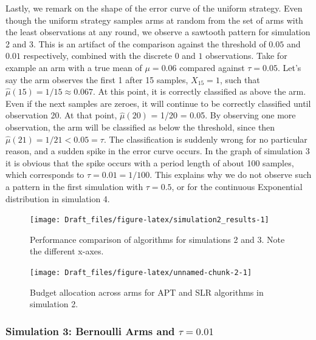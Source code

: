 \documentclass[11pt,]{article}
\begin{document}
Lastly, we remark on the shape of the error curve of the uniform
strategy. Even though the uniform strategy samples arms at random from
the set of arms with the least observations at any round, we observe a
sawtooth pattern for simulation 2 and 3. This is an artifact of the
comparison against the threshold of \(0.05\) and \(0.01\) respectively,
combined with the discrete \(0\) and \(1\) observations. Take for
example an arm with a true mean of \(\mu = 0.06\) compared against
\(\tau = 0.05\). Let's say the arm observes the first 1 after 15
samples, \(X_{15} = 1\), such that
\(\hat{\mu}(15) = 1/15 \approx 0.067\). At this point, it is correctly
classified as above the arm. Even if the next samples are zeroes, it
will continue to be correctly classified until observation 20. At that
point, \(\hat{\mu}(20)\) = 1/20 = 0.05. By observing one more
observation, the arm will be classified as below the threshold, since
then \(\hat{\mu}(21) = 1/21 < 0.05 = \tau\). The classification is
suddenly wrong for no particular reason, and a sudden spike in the error
curve occurs. In the graph of simulation 3 it is obvious that the spike
occurs with a period length of about 100 samples, which corresponds to
\(\tau = 0.01=1/100\). This explains why we do not observe such a
pattern in the first simulation with \(\tau = 0.5\), or for the
continuous Exponential distribution in simulation 4.

\begin{figure}

{\centering \texttt{[image: Draft\_files/figure-latex/simulation2\_results-1]} 

}

\caption{Performance comparison of algorithms for simulations 2 and 3. Note the different x-axes.}\label{fig:simulation2_results}
\end{figure}

\begin{figure}

{\centering \texttt{[image: Draft\_files/figure-latex/unnamed-chunk-2-1]} 

}

\caption{Budget allocation across arms for APT and SLR algorithms in simulation 2.}\label{fig:unnamed-chunk-2}
\end{figure}

\newpage

\subsubsection{\texorpdfstring{Simulation 3: Bernoulli Arms and
\(\tau = 0.01\)}{Simulation 3: Bernoulli Arms and \textbackslash{}tau = 0.01}}\label{simulation-3-bernoulli-arms-and-tau-0.01}
\end{document}
